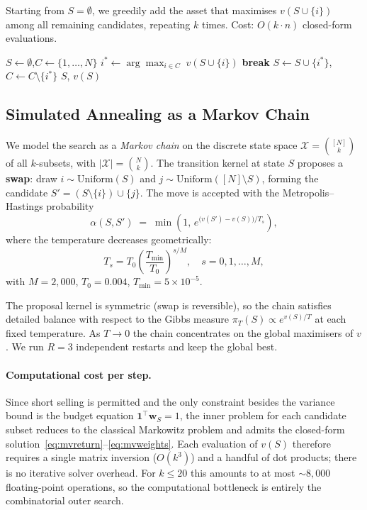 \documentclass[11pt]{article}
\begin{document}
Starting from $S=\emptyset$, we greedily add the asset that maximises
$v(S\cup\{i\})$ among all remaining candidates, repeating $k$ times.
Cost: $O(k\cdot n)$ closed-form evaluations.

\begin{algorithm}[h]
\caption{Sequential Greedy}
\begin{algorithmic}[1]
\State $S \leftarrow \emptyset$,\quad $C \leftarrow \{1,\ldots,N\}$
  \State $i^* \leftarrow \arg\max_{i\in C}\; v(S\cup\{i\})$
   \textbf{break} \EndIf
  \State $S \leftarrow S\cup\{i^*\}$,\quad $C \leftarrow C\setminus\{i^*\}$
\EndFor
\State \Return $S$, $v(S)$
\end{algorithmic}
\end{algorithm}

\subsection{Simulated Annealing as a Markov Chain}
\label{sec:sa}

We model the search as a \emph{Markov chain} on the discrete state space
$\mathcal{X} = \binom{[N]}{k}$ of all $k$-subsets, with
$|\mathcal{X}|=\binom{N}{k}$.  The transition kernel at state $S$ proposes a
\textbf{swap}: draw $i\sim\mathrm{Uniform}(S)$ and $j\sim\mathrm{Uniform}
([N]\setminus S)$, forming the candidate $S'=(S\setminus\{i\})\cup\{j\}$.
The move is accepted with the Metropolis--Hastings probability
\[
  \alpha(S,S') \;=\; \min\!\left(1,\,e^{\bigl(v(S')-v(S)\bigr)/T_s}\right),
\]
where the temperature decreases geometrically:
\begin{equation}
  T_s = T_0\!\left(\frac{T_{\min}}{T_0}\right)^{s/M},
  \quad s=0,1,\ldots,M,
  \label{eq:cooling}
\end{equation}
with $M=2{,}000$, $T_0=0.004$, $T_{\min}=5\times10^{-5}$.

The proposal kernel is symmetric (swap is reversible), so the chain satisfies
detailed balance with respect to the Gibbs measure $\pi_T(S)\propto e^{v(S)/T}$
at each fixed temperature.  As $T\to 0$ the chain concentrates on the global
maximisers of $v$.  We run $R=3$ independent restarts and keep the global best.

\paragraph{Computational cost per step.}
Since short selling is permitted and the only constraint besides the variance
bound is the budget equation $\mathbf{1}^\top\mathbf{w}_S=1$, the inner problem
for each candidate subset reduces to the classical Markowitz problem and admits
the closed-form solution~\eqref{eq:mvreturn}--\eqref{eq:mvweights}.  Each
evaluation of $v(S)$ therefore requires a single matrix inversion ($O(k^3)$) and
a handful of dot products; there is no iterative solver overhead.  For
$k\leq 20$ this amounts to at most $\sim\!8{,}000$ floating-point operations,
so the computational bottleneck is entirely the combinatorial outer search.
\end{document}

